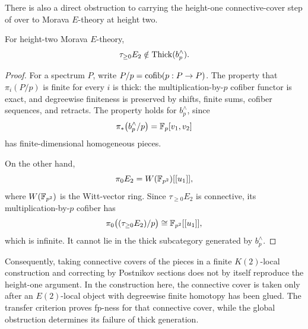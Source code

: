 There is also a direct obstruction to carrying the height-one
connective-cover step of \cite[Lemma~5.3]{LP2026} over to Morava
\(E\)-theory at height two.

\begin{proposition}
\label{scope:connective-cover}
For height-two Morava \(E\)-theory,
\[
 \tau_{\geq0}E_2\notin\operatorname{Thick}(b_p^\wedge).
\]
\end{proposition}

\begin{proof}
For a spectrum \(P\), write \(P/p=\operatorname{cofib}(p:P\to P)\).  The
property that \(\pi_i(P/p)\) is finite for every \(i\) is thick:
the multiplication-by-\(p\) cofiber functor is exact, and
degreewise finiteness is preserved by shifts, finite sums, cofiber
sequences, and retracts.  The property holds for \(b_p^\wedge\),
since
\[
 \pi_*\bigl(b_p^\wedge/p\bigr)=\mathbb F_p[v_1,v_2]
\]
has finite-dimensional homogeneous pieces.

On the other hand,
\[
 \pi_0E_2=W(\mathbb F_{p^2})[[u_1]],
\]
where \(W(\mathbb F_{p^2})\) is the Witt-vector ring.  Since
\(\tau_{\geq0}E_2\) is connective, its multiplication-by-\(p\)
cofiber has
\[
 \pi_0\bigl((\tau_{\geq0}E_2)/p\bigr)
      \cong\mathbb F_{p^2}[[u_1]],
\]
which is infinite.  It cannot lie in the thick subcategory generated
by \(b_p^\wedge\).
\end{proof}

Consequently, taking connective covers of the pieces in a finite
\(K(2)\)-local construction and correcting by Postnikov sections
does not by itself reproduce the height-one argument.  In the
construction here, the connective cover is taken only after an
\(E(2)\)-local object with degreewise finite homotopy has been
glued.  The transfer criterion proves fp-ness for that connective
cover, while the global obstruction determines its failure of thick
generation.

